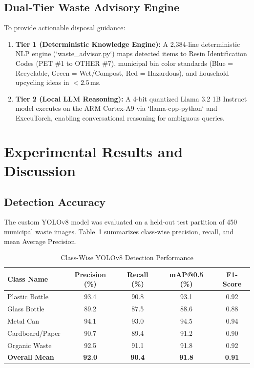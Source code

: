 \documentclass[conference]{IEEEtran}
\begin{document}
\subsection{Dual-Tier Waste Advisory Engine}
To provide actionable disposal guidance:
\begin{enumerate}
    \item \textbf{Tier 1 (Deterministic Knowledge Engine):} A 2,384-line deterministic NLP engine (`waste_advisor.py`) maps detected items to Resin Identification Codes (PET \#1 to OTHER \#7), municipal bin color standards (Blue = Recyclable, Green = Wet/Compost, Red = Hazardous), and household upcycling ideas in $<2.5$\,ms.
    \item \textbf{Tier 2 (Local LLM Reasoning):} A 4-bit quantized Llama 3.2 1B Instruct model executes on the ARM Cortex-A9 via `llama-cpp-python` and ExecuTorch, enabling conversational reasoning for ambiguous queries.
\end{enumerate}

\section{Experimental Results and Discussion}

\subsection{Detection Accuracy}
The custom YOLOv8 model was evaluated on a held-out test partition of 450 municipal waste images. Table~\ref{tab:results} summarizes class-wise precision, recall, and mean Average Precision.

\begin{table}[htbp]
\caption{Class-Wise YOLOv8 Detection Performance}
\label{tab:results}
\centering
\begin{tabular}{lcccc}
\toprule
\textbf{Class Name} & \textbf{Precision (\%)} & \textbf{Recall (\%)} & \textbf{mAP@0.5 (\%)} & \textbf{F1-Score} \\
\midrule
Plastic Bottle & 93.4 & 90.8 & 93.1 & 0.92 \\
Glass Bottle   & 89.2 & 87.5 & 88.6 & 0.88 \\
Metal Can      & 94.1 & 93.0 & 94.5 & 0.94 \\
Cardboard/Paper& 90.7 & 89.4 & 91.2 & 0.90 \\
Organic Waste  & 92.5 & 91.1 & 91.8 & 0.92 \\
\midrule
\textbf{Overall Mean} & \textbf{92.0} & \textbf{90.4} & \textbf{91.8} & \textbf{0.91} \\
\bottomrule
\end{tabular}
\end{table}
\end{document}
